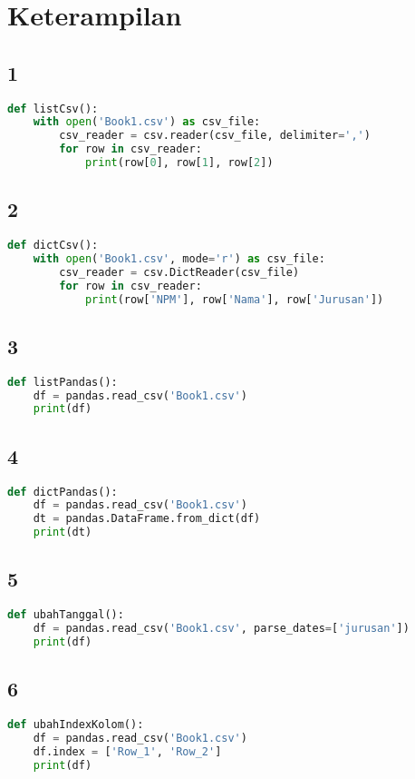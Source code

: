 \chapter*{Keterampilan}
\section*{1}
\begin{lstlisting}[language=Python]
def listCsv():
    with open('Book1.csv') as csv_file:
        csv_reader = csv.reader(csv_file, delimiter=',')
        for row in csv_reader:
            print(row[0], row[1], row[2])
\end{lstlisting}
\section*{2}
\begin{lstlisting}[language=Python]
def dictCsv():
    with open('Book1.csv', mode='r') as csv_file:
        csv_reader = csv.DictReader(csv_file)
        for row in csv_reader:
            print(row['NPM'], row['Nama'], row['Jurusan'])

\end{lstlisting}
\section*{3}
\begin{lstlisting}[language=Python]
def listPandas():
    df = pandas.read_csv('Book1.csv')
    print(df)
\end{lstlisting}
\section*{4}
\begin{lstlisting}[language=Python]
def dictPandas():
    df = pandas.read_csv('Book1.csv')
    dt = pandas.DataFrame.from_dict(df)
    print(dt)
\end{lstlisting}
\section*{5}
\begin{lstlisting}[language=Python]
def ubahTanggal():
    df = pandas.read_csv('Book1.csv', parse_dates=['jurusan'])
    print(df)
\end{lstlisting}
\section*{6}
\begin{lstlisting}[language=Python]
def ubahIndexKolom():
    df = pandas.read_csv('Book1.csv')
    df.index = ['Row_1', 'Row_2']
    print(df)

\end{lstlisting}
